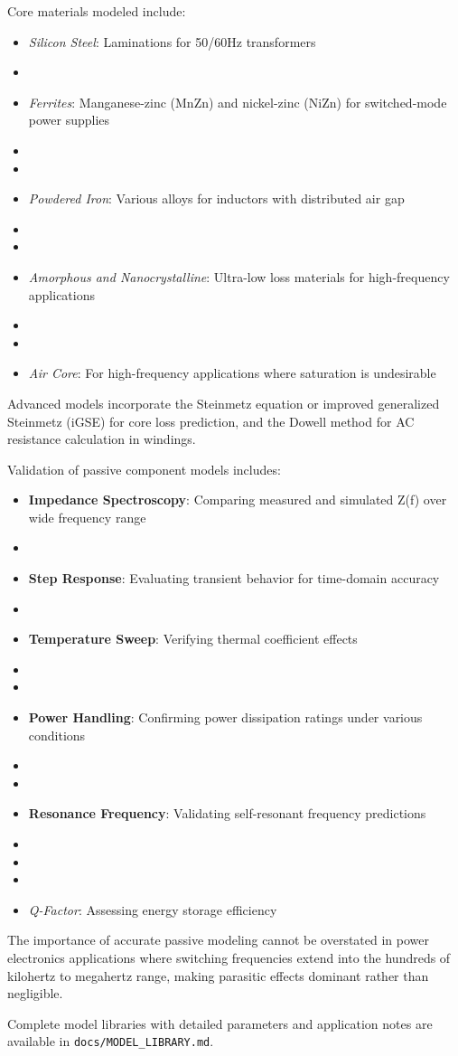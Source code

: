 Core materials modeled include:
\begin{itemize}
    \item \textit{Silicon Steel}: Laminations for 50/60Hz transformers
    \item \item \textit{Ferrites}: Manganese-zinc (MnZn) and nickel-zinc (NiZn) for switched-mode power supplies
    \item \item \item \textit{Powdered Iron}: Various alloys for inductors with distributed air gap
    \item \item \item \textit{Amorphous and Nanocrystalline}: Ultra-low loss materials for high-frequency applications
    \item \item \item \textit{Air Core}: For high-frequency applications where saturation is undesirable
\end{itemize}

Advanced models incorporate the Steinmetz equation or improved generalized Steinmetz (iGSE) for core loss prediction, and the Dowell method for AC resistance calculation in windings.

Validation of passive component models includes:
\begin{itemize}
    \item \textbf{Impedance Spectroscopy}: Comparing measured and simulated Z(f) over wide frequency range
    \item \item \textbf{Step Response}: Evaluating transient behavior for time-domain accuracy
    \item \item \textbf{Temperature Sweep}: Verifying thermal coefficient effects
    \item \item \item \textbf{Power Handling}: Confirming power dissipation ratings under various conditions
    \item \item \item \textbf{Resonance Frequency}: Validating self-resonant frequency predictions
    \item \item \item \item \textit{Q-Factor}: Assessing energy storage efficiency
\end{itemize}

The importance of accurate passive modeling cannot be overstated in power electronics applications where switching frequencies extend into the hundreds of kilohertz to megahertz range, making parasitic effects dominant rather than negligible.

Complete model libraries with detailed parameters and application notes are available in \texttt{docs/MODEL\_LIBRARY.md}.